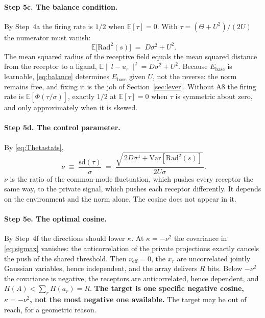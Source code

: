 \documentclass[11pt,a4paper]{article}
\newcommand{\EE}{\mathbb{E}}
\newcommand{\Var}{\mathrm{Var}}
\newcommand{\sd}{\mathrm{sd}}
\newcommand{\Phibar}{\overline{\Phi}}
\newcommand{\Ebase}{E_{\mathrm{base}}}
\newcommand{\nueff}{\nu_{\mathrm{eff}}}
\begin{document}
\paragraph{Step 5c. The balance condition.} By Step~4a the firing rate is $1/2$ when
$\EE[\tau]=0$. With $\tau=(\Theta+U^2)/(2U)$ the numerator must vanish:
\begin{equation}
  \boxed{\;\EE\big[\mathrm{Rad}^2(s)\big] \;=\; D\sigma^2 + U^2 . }
  \label{eq:balance}
\end{equation}
The mean squared radius of the receptive field equals the mean squared distance from the
receptor to a ligand, $\EE\|l-u_r\|^2 = D\sigma^2 + U^2$. Because $\Ebase$ is learnable,
\eqref{eq:balance} determines $\Ebase$ given $U$, not the reverse: the norm remains free,
and fixing it is the job of Section~\ref{sec:lever}. Without A8 the firing rate is
$\EE[\Phibar(\tau/\sigma)]$, exactly $1/2$ at $\EE[\tau]=0$ when $\tau$ is symmetric about
zero, and only approximately when it is skewed.

\paragraph{Step 5d. The control parameter.} By \eqref{eq:Thetastats},
\begin{equation}
  \boxed{\;\nu \;\equiv\; \frac{\sd(\tau)}{\sigma}
   \;=\; \frac{\sqrt{\,2D\sigma^4+\Var[\mathrm{Rad}^2(s)]\,}}{2U\sigma}. }
  \label{eq:nudef}
\end{equation}
$\nu$ is the ratio of the common-mode fluctuation, which pushes every receptor the same
way, to the private signal, which pushes each receptor differently. It depends on the
environment and the norm alone. The cosine does not appear in it.

\paragraph{Step 5e. The optimal cosine.} By Step~4f the directions should lower $\kappa$.
At $\kappa=-\nu^2$ the covariance in \eqref{eq:sigmax} vanishes: the anticorrelation of
the private projections exactly cancels the push of the shared threshold. Then
$\nueff=0$, the $x_r$ are uncorrelated jointly Gaussian variables, hence independent, and
the array delivers $R$ bits. Below $-\nu^2$ the covariance is negative, the receptors are
anticorrelated, hence dependent, and $H(A)<\sum_r H(a_r)=R$. \textbf{The target is one
specific negative cosine, $\kappa=-\nu^2$, not the most negative one available.} The
target may be out of reach, for a geometric reason.
\end{document}
